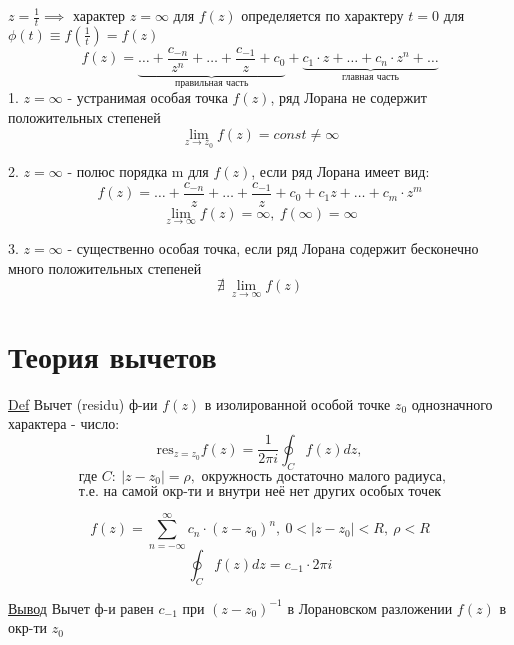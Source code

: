 \documentclass[a4paper]{article}
\begin{document}
$ z = \frac{1}{t} \implies $ характер $ z = \infty $ для $ f(z) $ определяется
по характеру $ t = 0 $ для $ \phi(t) \equiv f\left(\frac{1}{t}\right) = f(z) $ 
\[
    f(z) = \underbrace{\dots + \frac{c_{-n}}{z^{n}} + \dots + \frac{c_{-1}}{z} + c_0}_{\text{правильная часть}} + 
    \underbrace{c_1 \cdot z + \dots + c_n \cdot z^{n} + \dots}_{\text{главная часть}}
\]
1. $ z = \infty $ - устранимая особая точка $ f(z) $, ряд Лорана не содержит положительных
степеней
\[
    \lim_{z \to z_0} f(z) = const \neq \infty
\]

2. $ z = \infty $ - полюс порядка m для $ f(z) $, если ряд Лорана имеет вид:
\[
    f(z) = \dots + \frac{c_{-n}}{z} + \dots + \frac{c_{-1}}{z} + c_0 + c_1
    z + \dots + c_m \cdot z^{m}
\]
\[
    \lim_{z \to \infty} f(z) = \infty, \ f(\infty) = \infty
\]

3. $ z = \infty $ - существенно особая точка, если ряд Лорана содержит
бесконечно много положительных степеней
\[
    \nexists \ \lim_{z \to \infty} f(z)
\]

\section*{\centering Теория вычетов}
\begin{tcolorbox}
\underline{Def} Вычет (residu) ф-ии $ f(z) $ в изолированной особой точке
$ z_0 $ однозначного характера - число:
\[
    \text{res}_{z = z_0}f(z) = \frac{1}{2 \pi i} \oint_{C} f(z)dz,
\]
\[
    \text{ где } C: \ |z-z_0| = \rho, \text{ окружность достаточно малого радиуса,}
\]
\[
    \text{т.е. на самой окр-ти и внутри неё нет других особых точек}
\]
\end{tcolorbox}
\[
    f(z) = \sum_{n=-\infty}^{\infty} c_n \cdot (z- z_0)^{n}, \ 0 < |z-z_0| < R, \
    \rho < R
\]
\[
    \oint_{C} f(z) dz = c_{-1} \cdot 2 \pi i
\]

\underline{Вывод} Вычет ф-и равен $ c_{-1} $ при $ (z-z_0)^{-1} $ в Лорановском
разложении $ f(z) $ в окр-ти $ z_0 $ 
\end{document}
